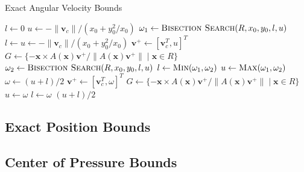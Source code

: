 \documentclass[conference]{IEEEtran}
\makeatletter
\def\BState{\State\hskip-\ALG@thistlm}
\makeatother
\begin{document}
\begin{algorithm}
\caption{Exact Angular Velocity Bounds}\label{alg:angular-velocity-bounds}
\begin{algorithmic}[1]
 \Return {$[0,0]$}
\EndIf
\State $l \gets 0$
\State $u \gets -\lVert\mathbf{v}_c\rVert/(x_0 + y_0^2/x_0)$
\State $\omega_1 \gets \Call{Bisection Search}{R,x_0,y_0,l,u}$
\State $l \gets u \gets -\lVert\mathbf{v}_c\rVert/(x_0 + y_0^2/x_0)$
\Do%
\State $\mathbf{v}^+ \gets [\mathbf{v}_c^T, u]^T$
\State $G \gets \{-\mathbf{x}\times A(\mathbf{x})\mathbf{v}^+ / \lVert A(\mathbf{x})\mathbf{v}^+ \rVert \;|\; \mathbf{x} \in R\}$
\State $\omega_2 \gets \Call{Bisection Search}{R,x_0,y_0,l,u}$
\State $l \gets \Call{Min}{\omega_1,\omega_2}$
\State $u \gets \Call{Max}{\omega_1,\omega_2}$
\State \Return {$[l, u]$}
\EndFunction
% 
\State $\omega \gets (u+l)/2$
\State $\mathbf{v}^+ \gets [\mathbf{v}_c^T, \omega]^T$
\State $G \gets \{-\mathbf{x}\times A(\mathbf{x})\mathbf{v}^+ / \lVert A(\mathbf{x})\mathbf{v}^+ \rVert \;|\; \mathbf{x} \in R\}$
\State $u \gets \omega$
\Else{} 
\State $l \gets \omega$
\EndIf
\EndWhile
\State \Return $(u+l)/2$
\EndFunction
\end{algorithmic}
\end{algorithm}

\subsection{Exact Position Bounds}\label{sec:cop-bounds}

\subsection{Center of Pressure Bounds}\label{sec:cop-bounds}



\end{document}
